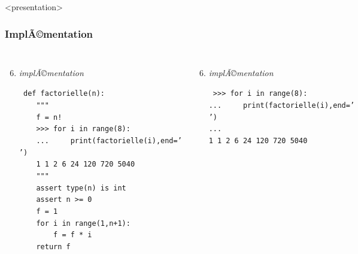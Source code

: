 \begin{frame}<presentation>
\frametitle{ImplÃ©mentation}
\begin{columns}[T]
\column{5.75cm}
\begin{enumerate}\setcounter{enumi}{5}
\item {\em implÃ©mentation}
\begin{minipage}[t]{5.5cm}\scriptsize\tt
def factorielle(n):\\
\mbox{}\ \ \ \ {"""}\\
\mbox{}\ \ \ \ {f = n!}\\
\mbox{}\ \ \ \ {>>> for i in range(8):}\\
\mbox{}\ \ \ \ {...\ \ \ \ \ print(factorielle(i),end=' ')}\\
\mbox{}\ \ \ \ {1 1 2 6 24 120 720 5040}\\
\mbox{}\ \ \ \ {"""}\\
\mbox{}\ \ \ \ assert type(n) is int\\
\mbox{}\ \ \ \ assert n >= 0\\
\mbox{}\ \ \ \ {f = 1}\\
\mbox{}\ \ \ \ \alert{for i in range(1,n+1):} \\
\mbox{}\ \ \ \ \ \ \ \ \alert{f = f * i}\\
\mbox{}\ \ \ \ return f
\end{minipage}
\end{enumerate}

\column{5.75cm}
\begin{enumerate}\setcounter{enumi}{5}
\item {\em implÃ©mentation}
\begin{minipage}[t]{5cm}\scriptsize\tt
>>> for i in range(8):\\
...\ \ \ \ \ print(factorielle(i),end=' ')\\
...\\
1 1 2 6 24 120 720 5040
\end{minipage}
\end{enumerate} 

\end{columns}
\pause

\end{frame}
\note{}


